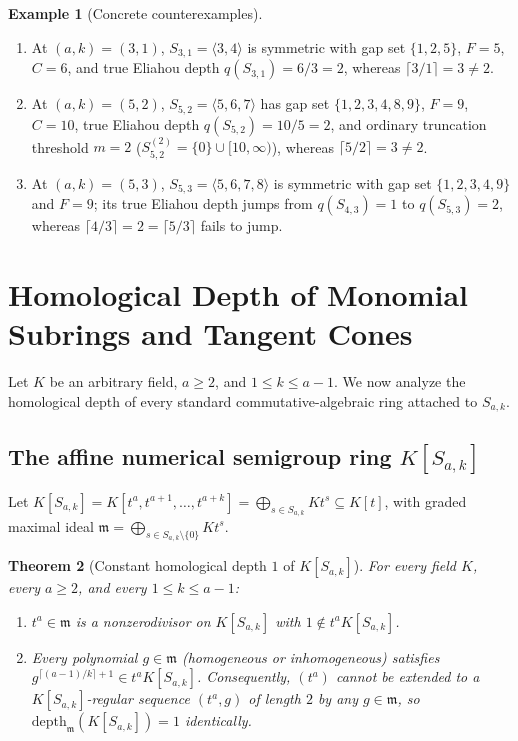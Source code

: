 \documentclass[11pt]{amsart}
\newtheorem{theorem}{Theorem}[section]
\theoremstyle{definition}
\newtheorem{example}[theorem]{Example}
\theoremstyle{remark}
\newcommand{\mm}{\mathfrak{m}}
\newcommand{\depth}{\mathrm{depth}}
\begin{document}
\begin{example}[Concrete counterexamples]
\label{ex:comb}
\begin{enumerate}
  \item[(a)] At $(a,k) = (3,1)$, $S_{3,1} = \langle 3, 4 \rangle$ is symmetric with gap set $\{1, 2, 5\}$, $F = 5$, $C = 6$, and true Eliahou depth $q(S_{3,1}) = 6/3 = 2$, whereas $\lceil 3/1 \rceil = 3 \ne 2$.
  \item[(b)] At $(a,k) = (5,2)$, $S_{5,2} = \langle 5, 6, 7 \rangle$ has gap set $\{1, 2, 3, 4, 8, 9\}$, $F = 9$, $C = 10$, true Eliahou depth $q(S_{5,2}) = 10/5 = 2$, and ordinary truncation threshold $m = 2$ ($S_{5,2}^{(2)} = \{0\} \cup [10, \infty)$), whereas $\lceil 5/2 \rceil = 3 \ne 2$.
  \item[(c)] At $(a,k) = (5,3)$, $S_{5,3} = \langle 5, 6, 7, 8 \rangle$ is symmetric with gap set $\{1, 2, 3, 4, 9\}$ and $F = 9$; its true Eliahou depth jumps from $q(S_{4,3}) = 1$ to $q(S_{5,3}) = 2$, whereas $\lceil 4/3 \rceil = 2 = \lceil 5/3 \rceil$ fails to jump.
\end{enumerate}
\end{example}

\section{Homological Depth of Monomial Subrings and Tangent Cones}
\label{sec:homological}

Let $K$ be an arbitrary field, $a \ge 2$, and $1 \le k \le a-1$. We now analyze the homological depth of every standard commutative-algebraic ring attached to $S_{a,k}$.

\subsection{The affine numerical semigroup ring \texorpdfstring{$K[S_{a,k}]$}{K[S\_\{a,k\}]}}
Let $K[S_{a,k}] = K[t^a, t^{a+1}, \dots, t^{a+k}] = \bigoplus_{s \in S_{a,k}} K t^s \subseteq K[t]$, with graded maximal ideal $\mm = \bigoplus_{s \in S_{a,k} \setminus \{0\}} K t^s$.

\begin{theorem}[{Constant homological depth $1$ of $K[S_{a,k}]$}]
\label{thm:affine-depth}
For every field $K$, every $a \ge 2$, and every $1 \le k \le a-1$:
\begin{enumerate}
  \item[(i)] $t^a \in \mm$ is a nonzerodivisor on $K[S_{a,k}]$ with $1 \notin t^a K[S_{a,k}]$.
  \item[(ii)] Every polynomial $g \in \mm$ (homogeneous or inhomogeneous) satisfies $g^{\lceil (a-1)/k \rceil + 1} \in t^a K[S_{a,k}]$. Consequently, $(t^a)$ cannot be extended to a $K[S_{a,k}]$-regular sequence $(t^a, g)$ of length $2$ by any $g \in \mm$, so $\depth_{\mm}(K[S_{a,k}]) = 1$ identically.
\end{enumerate}
\end{theorem}
\end{document}
